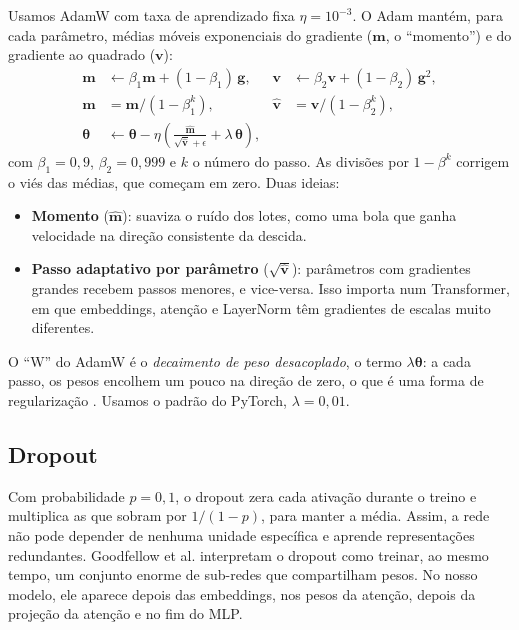 \documentclass[11pt,a4paper]{article}
\begin{document}
Usamos AdamW com taxa de aprendizado fixa $\eta = 10^{-3}$. O Adam \cite{adam} mantém, para cada parâmetro, médias móveis exponenciais do gradiente ($\bm m$, o ``momento'') e do gradiente ao quadrado ($\bm v$):
\begin{align*}
\bm m &\leftarrow \beta_1 \bm m + (1-\beta_1)\,\bm g, &
\bm v &\leftarrow \beta_2 \bm v + (1-\beta_2)\,\bm g^2, \\
\hat{\bm m} &= \bm m / (1-\beta_1^{k}), &
\hat{\bm v} &= \bm v / (1-\beta_2^{k}), \\
\bm\theta &\leftarrow \bm\theta - \eta \left( \frac{\hat{\bm m}}{\sqrt{\hat{\bm v}} + \epsilon} + \lambda\,\bm\theta \right),
\end{align*}
com $\beta_1 = 0{,}9$, $\beta_2 = 0{,}999$ e $k$ o número do passo. As divisões por $1-\beta^k$ corrigem o viés das médias, que começam em zero. Duas ideias:

\begin{itemize}
\item \textbf{Momento} ($\hat{\bm m}$): suaviza o ruído dos lotes, como uma bola que ganha velocidade na direção consistente da descida.
\item \textbf{Passo adaptativo por parâmetro} ($\sqrt{\hat{\bm v}}$): parâmetros com gradientes grandes recebem passos menores, e vice-versa. Isso importa num Transformer, em que embeddings, atenção e LayerNorm têm gradientes de escalas muito diferentes.
\end{itemize}

O ``W'' do AdamW \cite{adamw} é o \emph{decaimento de peso desacoplado}, o termo $\lambda\bm\theta$: a cada passo, os pesos encolhem um pouco na direção de zero, o que é uma forma de regularização \cite[seção~7.1]{goodfellow}. Usamos o padrão do PyTorch, $\lambda = 0{,}01$.

\subsection{Dropout}

Com probabilidade $p = 0{,}1$, o dropout \cite{dropout} zera cada ativação durante o treino e multiplica as que sobram por $1/(1-p)$, para manter a média. Assim, a rede não pode depender de nenhuma unidade específica e aprende representações redundantes. Goodfellow et al. \cite[seção~7.12]{goodfellow} interpretam o dropout como treinar, ao mesmo tempo, um conjunto enorme de sub-redes que compartilham pesos. No nosso modelo, ele aparece depois das embeddings, nos pesos da atenção, depois da projeção da atenção e no fim do MLP.
\end{document}
